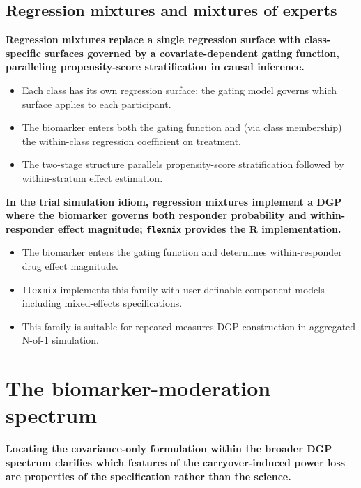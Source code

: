 \documentclass[
  11pt,
]{article}
\begin{document}
\subsection{Regression mixtures and mixtures of experts}\label{regression-mixtures-and-mixtures-of-experts}

\textbf{Regression mixtures replace a single regression surface with
class-specific surfaces governed by a covariate-dependent gating
function, paralleling propensity-score stratification in causal
inference.}

\begin{itemize}\setlength{\itemsep}{2pt}\setlength{\parskip}{0pt}
\item Each class has its own regression surface; the gating model
  governs which surface applies to each participant.
\item The biomarker enters both the gating function and (via class
  membership) the within-class regression coefficient on treatment.
\item The two-stage structure parallels propensity-score
  stratification followed by within-stratum effect estimation.
\end{itemize}

\textbf{In the trial simulation idiom, regression mixtures implement a
DGP where the biomarker governs both responder probability and
within-responder effect magnitude; \texttt{flexmix} provides the R
implementation.}

\begin{itemize}\setlength{\itemsep}{2pt}\setlength{\parskip}{0pt}
\item The biomarker enters the gating function and determines
  within-responder drug effect magnitude.
\item \texttt{flexmix} implements this family with user-definable
  component models including mixed-effects specifications.
\item This family is suitable for repeated-measures DGP construction
  in aggregated N-of-1 simulation.
\end{itemize}

\section{The biomarker-moderation spectrum}\label{the-biomarker-moderation-spectrum}

\textbf{Locating the covariance-only formulation within the broader
DGP spectrum clarifies which features of the carryover-induced power
loss are properties of the specification rather than the science.}
\end{document}
